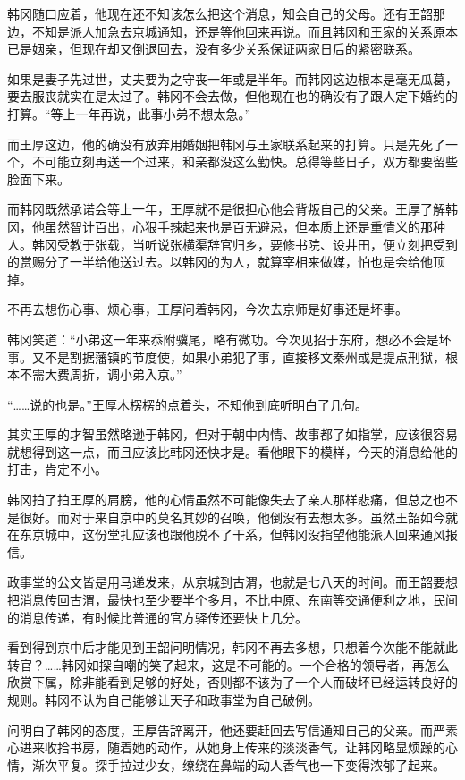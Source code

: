 韩冈随口应着，他现在还不知该怎么把这个消息，知会自己的父母。还有王韶那边，不知是派人加急去京城通知，还是等他回来再说。而且韩冈和王家的关系原本已是姻亲，但现在却又倒退回去，没有多少关系保证两家日后的紧密联系。

如果是妻子先过世，丈夫要为之守丧一年或是半年。而韩冈这边根本是毫无瓜葛，要去服丧就实在是太过了。韩冈不会去做，但他现在也的确没有了跟人定下婚约的打算。“等上一年再说，此事小弟不想太急。”

而王厚这边，他的确没有放弃用婚姻把韩冈与王家联系起来的打算。只是先死了一个，不可能立刻再送一个过来，和亲都没这么勤快。总得等些日子，双方都要留些脸面下来。

而韩冈既然承诺会等上一年，王厚就不是很担心他会背叛自己的父亲。王厚了解韩冈，他虽然智计百出，心狠手辣起来也是百无避忌，但本质上还是重情义的那种人。韩冈受教于张载，当听说张横渠辞官归乡，要修书院、设井田，便立刻把受到的赏赐分了一半给他送过去。以韩冈的为人，就算宰相来做媒，怕也是会给他顶掉。

不再去想伤心事、烦心事，王厚问着韩冈，今次去京师是好事还是坏事。

韩冈笑道：“小弟这一年来忝附骥尾，略有微功。今次见招于东府，想必不会是坏事。又不是割据藩镇的节度使，如果小弟犯了事，直接移文秦州或是提点刑狱，根本不需大费周折，调小弟入京。”

“……说的也是。”王厚木楞楞的点着头，不知他到底听明白了几句。

其实王厚的才智虽然略逊于韩冈，但对于朝中内情、故事都了如指掌，应该很容易就想得到这一点，而且应该比韩冈还快才是。看他眼下的模样，今天的消息给他的打击，肯定不小。

韩冈拍了拍王厚的肩膀，他的心情虽然不可能像失去了亲人那样悲痛，但总之也不是很好。而对于来自京中的莫名其妙的召唤，他倒没有去想太多。虽然王韶如今就在东京城中，这份堂扎应该也跟他脱不了干系，但韩冈没指望他能派人回来通风报信。

政事堂的公文皆是用马递发来，从京城到古渭，也就是七八天的时间。而王韶要想把消息传回古渭，最快也至少要半个多月，不比中原、东南等交通便利之地，民间的消息传递，有时候比普通的官方驿传还要快上几分。

看到得到京中后才能见到王韶问明情况，韩冈不再去多想，只想着今次能不能就此转官？……韩冈如探自嘲的笑了起来，这是不可能的。一个合格的领导者，再怎么欣赏下属，除非能看到足够的好处，否则都不该为了一个人而破坏已经运转良好的规则。韩冈不认为自己能够让天子和政事堂为自己破例。

问明白了韩冈的态度，王厚告辞离开，他还要赶回去写信通知自己的父亲。而严素心进来收拾书房，随着她的动作，从她身上传来的淡淡香气，让韩冈略显烦躁的心情，渐次平复。探手拉过少女，缭绕在鼻端的动人香气也一下变得浓郁了起来。

